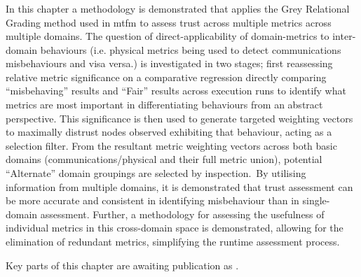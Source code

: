 
\subsubsection{}

In this chapter a methodology is demonstrated that applies the Grey Relational Grading method used in \gls{mtfm} to assess trust across multiple metrics across multiple domains.
The question of direct-applicability of domain-metrics to inter-domain behaviours (i.e. physical metrics being used to detect communications misbehaviours and visa versa.) is investigated in two stages; first reassessing relative metric significance on a comparative regression directly comparing ``misbehaving'' results and ``Fair'' results across execution runs to identify what metrics are most important in  differentiating behaviours from an abstract perspective. 
This significance is then used to generate targeted weighting vectors to maximally distrust nodes observed exhibiting that behaviour, acting as a selection filter.
From the resultant metric weighting vectors across both basic domains (communications/physical and their full metric union), potential ``Alternate'' domain groupings are selected by inspection.\
By utilising information from multiple domains, it is demonstrated that trust assessment can be more accurate and consistent in identifying misbehaviour than in single-domain assessment.
Further, a methodology for assessing the usefulness of individual metrics in this cross-domain space is demonstrated, allowing for the elimination of redundant metrics, simplifying the runtime assessment process.

{\sloppy \raggedright
Key parts of this chapter are awaiting publication as  .
}


